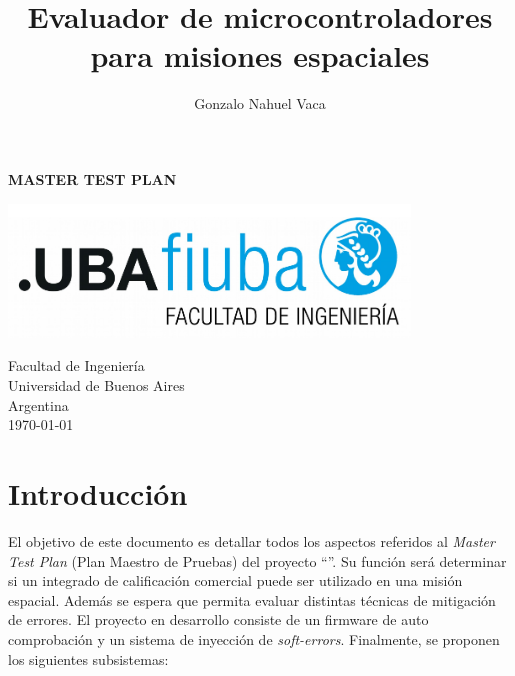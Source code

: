 \documentclass[
    11pt,
    spanish,
	a4paper
]{article}
\title{Evaluador de microcontroladores para misiones espaciales}
\author{Gonzalo Nahuel Vaca}
\def\doctype{MASTER TEST PLAN}
\begin{document}
\makeatletter
\begin{titlepage}
	\begin{center}
		\vspace*{1cm}
		
		\Huge
		\textbf{\doctype}
		
		\vspace{0.5cm}
		\LARGE
		\@title
		
		\vspace{1.5cm}
		
		\textbf{\@author}

		\vspace{3.5cm}

		\includegraphics[width=0.8\textwidth]{img/logoFIUBA.pdf}
		
		\vfill
		Facultad de Ingeniería\\
		Universidad de Buenos Aires\\
		Argentina\\
		\today
	\end{center}
\end{titlepage}
\makeatother
\newpage

\section{Introducción}
\label{sec:introduccion}

El objetivo de este documento es detallar todos los aspectos referidos al \emph{Master Test Plan} (Plan Maestro de Pruebas) del proyecto ``\MyTitle ''.
Su función será determinar si un integrado de calificación comercial puede ser utilizado en una misión espacial. Además se espera que permita evaluar distintas técnicas de mitigación de errores.
El proyecto en desarrollo consiste de un firmware de auto comprobación y un sistema de inyección de \emph{soft-errors}.
Finalmente, se proponen los siguientes subsistemas:
\end{document}
